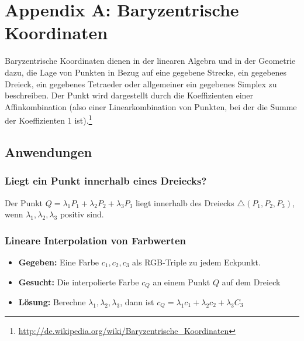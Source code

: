 \section{Appendix A: Baryzentrische Koordinaten}
Baryzentrische Koordinaten dienen in der linearen Algebra und in der Geometrie dazu, die Lage von Punkten in Bezug auf eine gegebene Strecke, ein gegebenes Dreieck, ein gegebenes Tetraeder oder allgemeiner ein gegebenes Simplex zu beschreiben. Der Punkt wird dargestellt durch die Koeffizienten einer Affinkombination (also einer Linearkombination von Punkten, bei der die Summe der Koeffizienten 1 ist).\footnote{\url{http://de.wikipedia.org/wiki/Baryzentrische_Koordinaten}}

\subsection{Anwendungen}

\subsubsection{Liegt ein Punkt innerhalb eines Dreiecks?}
Der Punkt \(Q = \lambda_1 P_1 + \lambda_2 P_2 + \lambda_3 P_3\) liegt innerhalb des Dreiecks \(\triangle(P_1,P_2,P_3)\), wenn \(\lambda_1,\lambda_2,\lambda_3\) positiv sind.

\subsubsection{Lineare Interpolation von Farbwerten}
\begin{itemize}
	\item \textbf{Gegeben:} Eine Farbe \(c_1,c_2,c_3\) als RGB-Triple zu jedem Eckpunkt.
	\item \textbf{Gesucht:} Die interpolierte Farbe \(c_Q\) an einem Punkt \(Q\) auf dem Dreieck
	\item \textbf{Lösung:} Berechne \(\lambda_1,\lambda_2,\lambda_3\), dann ist \(c_Q=\lambda_1 c_1+\lambda_2 c_2 + \lambda_3 C_3\)
\end{itemize}

